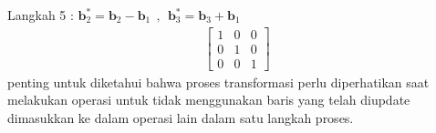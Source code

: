 Langkah 5 : $\textbf{b}^*_2= \textbf{b}_2 - \textbf{b}_1~~,~~\textbf{b}^*_3= \textbf{b}_3 + \textbf{b}_1$ \\
\begin{align*}
	\left[
	\begin{array}{rrr} 
		1 & 0 & 0\\
		0 & 1 & 0\\
		0 &0 & 1 
	\end{array} 
	\right]
\end{align*}
penting untuk diketahui bahwa proses transformasi perlu diperhatikan saat melakukan operasi untuk tidak menggunakan baris yang telah diupdate dimasukkan ke dalam operasi lain dalam satu langkah proses.
